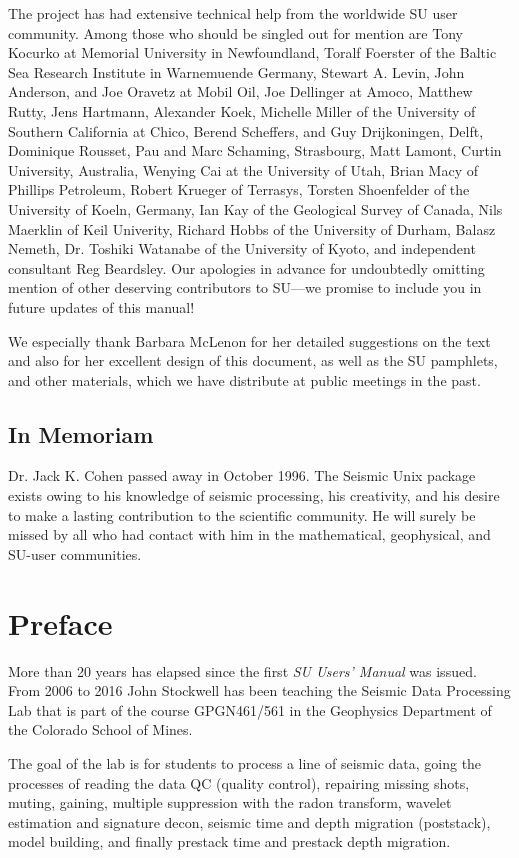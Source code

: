 The project has had extensive technical help from the
worldwide SU user community.
Among those who should be singled out for mention are Tony Kocurko at
Memorial University in Newfoundland, Toralf Foerster of the 
Baltic Sea Research Institute in Warnemuende Germany, Stewart A. Levin, John
Anderson, and Joe Oravetz at Mobil Oil, Joe Dellinger at Amoco, Matthew
Rutty, Jens Hartmann, Alexander Koek, Michelle Miller
of the University of Southern California at Chico,
Berend Scheffers, and Guy Drijkoningen, Delft,
Dominique Rousset, Pau and Marc Schaming, Strasbourg,
Matt Lamont, Curtin University, Australia, 
Wenying Cai at the University of Utah, Brian Macy of Phillips Petroleum,
Robert Krueger of Terrasys, Torsten Shoenfelder of the University
of Koeln, Germany, Ian Kay of the Geological Survey of Canada, Nils Maerklin of Keil Univerity,  Richard Hobbs of the University of Durham, Balasz Nemeth,
Dr. Toshiki Watanabe of the University of Kyoto, and independent
consultant Reg Beardsley.
Our apologies in advance for undoubtedly omitting mention 
of other deserving contributors to
 SU---we promise to include you in future updates of this manual!

We especially thank Barbara McLenon for her detailed suggestions on the text
and also for her excellent design of this document, as well as the
SU pamphlets, and other materials, which we have distribute at public meetings
in the past.

\section*{In Memoriam}
Dr. Jack K. Cohen passed away in October 1996. The Seismic Unix
package exists owing to his knowledge of seismic processing,
his creativity, and his desire to make a lasting contribution
to the scientific community.  He will surely be missed by all
who had contact with him in the mathematical, geophysical, and 
SU-user communities.
\chapter*{Preface}
More than 20 years has elapsed since the first {\em SU Users' Manual\/}
was issued. From 2006 to 2016 John Stockwell has been teaching
the Seismic Data Processing Lab that is part of the course
GPGN461/561 in the Geophysics Department of the Colorado School
of Mines.

The goal of the lab is for students to process a line of seismic
data, going the processes of reading the data QC (quality control),
repairing missing shots, muting, gaining, multiple suppression
with the radon transform, wavelet estimation and signature decon,
seismic time and depth migration (poststack), model building, and finally
prestack time and prestack depth migration. 

